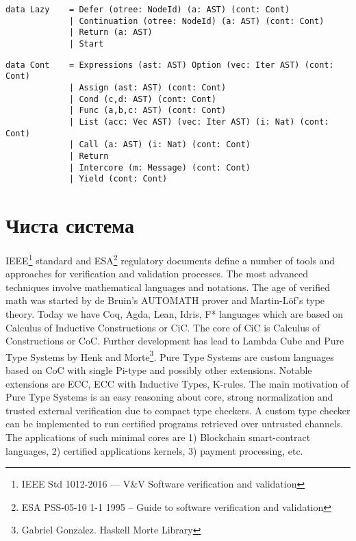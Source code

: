 \begin{lstlisting}
data Lazy    = Defer (otree: NodeId) (a: AST) (cont: Cont)
             | Continuation (otree: NodeId) (a: AST) (cont: Cont)
             | Return (a: AST)
             | Start
\end{lstlisting}

\begin{lstlisting}
data Cont    = Expressions (ast: AST) Option (vec: Iter AST) (cont: Cont)
             | Assign (ast: AST) (cont: Cont)
             | Cond (c,d: AST) (cont: Cont)
             | Func (a,b,c: AST) (cont: Cont)
             | List (acc: Vec AST) (vec: Iter AST) (i: Nat) (cont: Cont)
             | Call (a: AST) (i: Nat) (cont: Cont)
             | Return
             | Intercore (m: Message) (cont: Cont)
             | Yield (cont: Cont)
\end{lstlisting}

\section{Чиста система}

IEEE\footnote{IEEE Std 1012-2016  --- V\&V Software verification and validation} standard
and ESA\footnote{ESA PSS-05-10 1-1 1995 -- Guide to software verification and validation} regulatory documents define a number of tools and approaches for verification and validation processes. 
The most advanced techniques involve mathematical languages and notations. 
The age of verified math was started by de Bruin's AUTOMATH prover and Martin-Löf\cite{Lof84}'s type theory. 
Today we have Coq, Agda, Lean, Idris, F* languages which are based on Calculus of Inductive Constructions or CiC\cite{Mohring15}.
The core of CiC is Calculus of Constructions or CoC\cite{Coq88}.
Further development has lead to Lambda Cube\cite{Henk93} and Pure Type Systems by Henk\cite{Erik97} and Morte\footnote{Gabriel Gonzalez. Haskell Morte Library}.
Pure Type Systems are custom languages based on CoC with single Pi-type and possibly other extensions.
Notable extensions are ECC, ECC with Inductive Types\cite{Ore92}, K-rules\cite{Barthe95}.
The main motivation of Pure Type Systems is an easy reasoning about core, strong normalization and trusted external verification due to compact type checkers.
A custom type checker can be implemented to run certified programs retrieved over untrusted channels.
The applications of such minimal cores are 1) Blockchain smart-contract languages, 2) certified applications kernels, 3) payment processing, etc.

